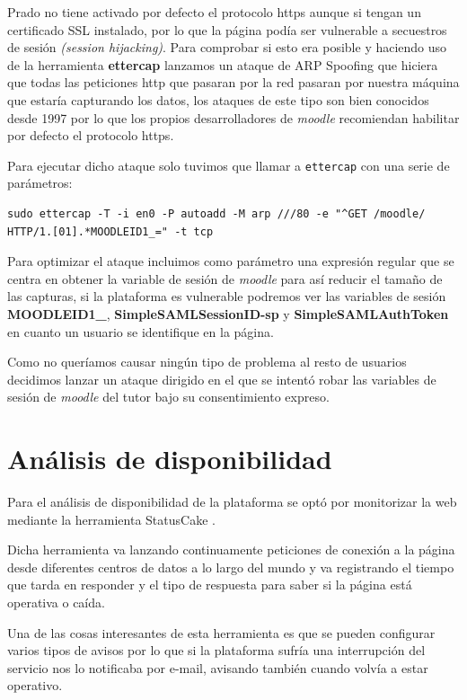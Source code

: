 \bigskip
Prado no tiene activado por defecto el protocolo https aunque si tengan un certificado SSL instalado, por lo que la página podía ser vulnerable a secuestros de sesión \textit{(session hijacking)}. Para comprobar si esto era posible y haciendo uso de la herramienta \textbf{ettercap} lanzamos un ataque de ARP Spoofing\cite{art_08} que hiciera que todas las peticiones http que pasaran por la red pasaran por nuestra máquina que estaría capturando los datos, los ataques de este tipo son bien conocidos desde 1997\cite{art_07} por lo que los propios desarrolladores de \textit{moodle} recomiendan habilitar por defecto el protocolo https\cite{art_10}.

\bigskip
Para ejecutar dicho ataque solo tuvimos que llamar a \texttt{ettercap} con una serie de parámetros:

\begin{lstlisting}
sudo ettercap -T -i en0 -P autoadd -M arp ///80 -e "^GET /moodle/ HTTP/1.[01].*MOODLEID1_=" -t tcp
\end{lstlisting}

Para optimizar el ataque incluimos como parámetro una expresión regular que se centra en obtener la variable de sesión de \textit{moodle} para así reducir el tamaño de las capturas, si la plataforma es vulnerable podremos ver las variables de sesión \textbf{MOODLEID1\_}, \textbf{SimpleSAMLSessionID-sp} y \textbf{SimpleSAMLAuthToken} en cuanto un usuario se identifique en la página.

\bigskip
Como no queríamos causar ningún tipo de problema al resto de usuarios decidimos lanzar un ataque dirigido en el que se intentó robar las variables de sesión de \textit{moodle} del tutor bajo su consentimiento expreso.

\section{Análisis de disponibilidad}

Para el análisis de  disponibilidad de la plataforma se optó por monitorizar la web mediante la herramienta StatusCake \cite{statuscake}.

\bigskip
Dicha herramienta va lanzando continuamente peticiones de conexión a la página desde diferentes centros de datos a lo largo del mundo y va registrando el tiempo que tarda en responder y el tipo de respuesta para saber si la página está operativa o caída.

\bigskip
Una de las cosas interesantes de esta herramienta es que se pueden configurar varios tipos de avisos por lo que si la plataforma sufría una interrupción del servicio nos lo notificaba por e-mail, avisando también cuando volvía a estar operativo.



